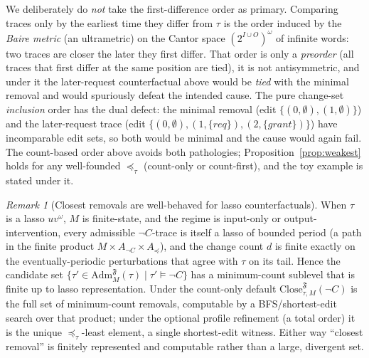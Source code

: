 \documentclass[11pt]{article}
\theoremstyle{remark}
\newtheorem{remark}{Remark}
\newcommand{\Close}{\mathrm{Close}}
\newcommand{\Frame}{\mathfrak{F}}
\newcommand{\Adm}{\mathrm{Adm}}
\begin{document}
We deliberately do \emph{not} take the first-difference order as primary.
Comparing traces only by the earliest time they differ from \(\tau\) is the order
induced by the \emph{Baire metric} (an ultrametric) on the Cantor space
\((2^{I\cup O})^\omega\) of infinite words: two traces are closer the later they
first differ. That order is only a \emph{preorder} (all traces that first differ
at the same position are tied), it is not antisymmetric, and under it the
later-request counterfactual above would be \emph{tied} with the minimal removal
and would spuriously defeat the intended cause. The pure change-set
\emph{inclusion} order has the dual defect: the minimal removal (edit
\(\{(0,\emptyset),(1,\emptyset)\}\)) and the later-request trace (edit
\(\{(0,\emptyset),(1,\{req\}),(2,\{grant\})\}\)) have incomparable edit sets, so
both would be minimal and the cause would again fail. The count-based order above
avoids both pathologies; Proposition~\ref{prop:weakest} holds for any well-founded
\(\preceq_\tau\) (count-only or count-first), and the toy example is stated under
it.

\begin{remark}[Closest removals are well-behaved for lasso counterfactuals]
\label{rem:lasso-close}
When \(\tau\) is a lasso \(uv^\omega\), \(M\) is finite-state, and the regime is
input-only or output-intervention, every admissible \(\neg C\)-trace is itself a
lasso of bounded period (a path in the finite product
\(M\times A_{\neg C}\times A_{\preceq}\)), and the change count \(d\) is finite
exactly on the eventually-periodic perturbations that agree with \(\tau\) on its
tail. Hence the candidate set
\(\{\tau'\in\Adm_M^{\Frame}(\tau)\mid\tau'\models\neg C\}\) has a minimum-count
sublevel that is finite up to lasso representation. Under the count-only default
\(\Close_{\tau,M}^{\Frame}(\neg C)\) is the full set of minimum-count removals,
computable by a BFS/shortest-edit search over that product; under the optional
profile refinement (a total order) it is the unique \(\preceq_\tau\)-least
element, a single shortest-edit witness. Either way ``closest removal'' is finitely
represented and computable rather than a large, divergent set.
\end{remark}
\end{document}

